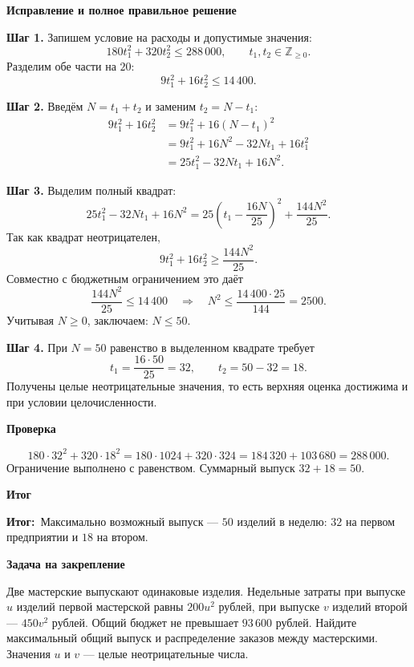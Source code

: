 \documentclass[a4paper,12pt]{article}
\newcommand{\outcome}{\textcolor{accent}{\textbf{Итог:}}}
\newcommand{\sublabel}[1]{\par\vspace{0.35em}\noindent\textbf{#1}\par\vspace{0.05em}}
\begin{document}
\sublabel{Исправление и полное правильное решение}
\textbf{Шаг 1.} Запишем условие на расходы и допустимые значения:
\[
180t_1^2+320t_2^2\le 288\,000,
\qquad t_1,t_2\in\mathbb Z_{\ge0}.
\]
Разделим обе части на $20$:
\[
9t_1^2+16t_2^2\le14\,400.
\]

\textbf{Шаг 2.} Введём $N=t_1+t_2$ и заменим $t_2=N-t_1$:
\begin{align*}
9t_1^2+16t_2^2
 &=9t_1^2+16(N-t_1)^2\\
 &=9t_1^2+16N^2-32Nt_1+16t_1^2\\
 &=25t_1^2-32Nt_1+16N^2.
\end{align*}

\textbf{Шаг 3.} Выделим полный квадрат:
\[
25t_1^2-32Nt_1+16N^2
=25\left(t_1-\frac{16N}{25}\right)^2
 +\frac{144N^2}{25}.
\]
Так как квадрат неотрицателен,
\[
9t_1^2+16t_2^2\ge\frac{144N^2}{25}.
\]
Совместно с бюджетным ограничением это даёт
\[
\frac{144N^2}{25}\le14\,400
\quad\Longrightarrow\quad
N^2\le\frac{14\,400\cdot25}{144}=2500.
\]
Учитывая $N\ge0$, заключаем: $N\le50$.

\textbf{Шаг 4.} При $N=50$ равенство в выделенном квадрате требует
\[
t_1=\frac{16\cdot50}{25}=32,
\qquad t_2=50-32=18.
\]
Получены целые неотрицательные значения, то есть верхняя оценка достижима и при условии целочисленности.

\sublabel{Проверка}
\[
180\cdot32^2+320\cdot18^2
=180\cdot1024+320\cdot324
=184\,320+103\,680=288\,000.
\]
Ограничение выполнено с равенством. Суммарный выпуск $32+18=50$.

\sublabel{Итог}
\outcome\ Максимально возможный выпуск --- $\boxed{50}$ изделий в неделю: $\boxed{32}$ на первом предприятии и $\boxed{18}$ на втором.

\sublabel{Задача на закрепление}
Две мастерские выпускают одинаковые изделия. Недельные затраты при выпуске $u$ изделий первой мастерской равны $200u^2$ рублей, при выпуске $v$ изделий второй --- $450v^2$ рублей. Общий бюджет не превышает $93\,600$ рублей. Найдите максимальный общий выпуск и распределение заказов между мастерскими. Значения $u$ и $v$ --- целые неотрицательные числа.
\end{document}
